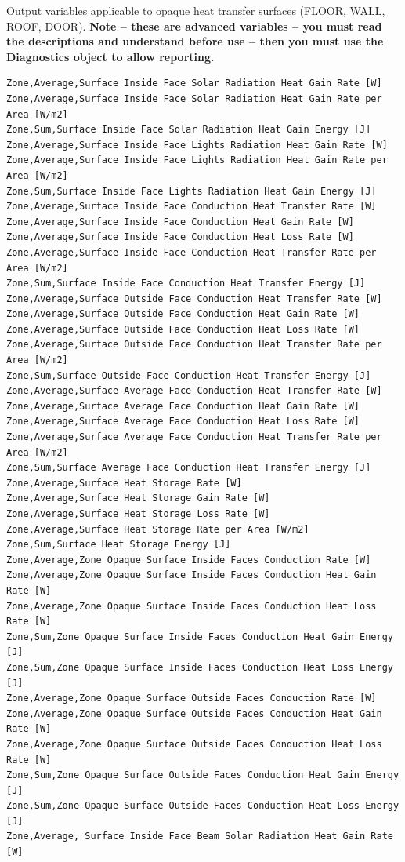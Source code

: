 Output variables applicable to opaque heat transfer surfaces (FLOOR, WALL, ROOF, DOOR). \textbf{Note -- these are advanced variables -- you must read the descriptions and understand before use -- then you must use the Diagnostics object to allow reporting.}

\begin{lstlisting}
Zone,Average,Surface Inside Face Solar Radiation Heat Gain Rate [W]
Zone,Average,Surface Inside Face Solar Radiation Heat Gain Rate per Area [W/m2]
Zone,Sum,Surface Inside Face Solar Radiation Heat Gain Energy [J]
Zone,Average,Surface Inside Face Lights Radiation Heat Gain Rate [W]
Zone,Average,Surface Inside Face Lights Radiation Heat Gain Rate per Area [W/m2]
Zone,Sum,Surface Inside Face Lights Radiation Heat Gain Energy [J]
Zone,Average,Surface Inside Face Conduction Heat Transfer Rate [W]
Zone,Average,Surface Inside Face Conduction Heat Gain Rate [W]
Zone,Average,Surface Inside Face Conduction Heat Loss Rate [W]
Zone,Average,Surface Inside Face Conduction Heat Transfer Rate per Area [W/m2]
Zone,Sum,Surface Inside Face Conduction Heat Transfer Energy [J]
Zone,Average,Surface Outside Face Conduction Heat Transfer Rate [W]
Zone,Average,Surface Outside Face Conduction Heat Gain Rate [W]
Zone,Average,Surface Outside Face Conduction Heat Loss Rate [W]
Zone,Average,Surface Outside Face Conduction Heat Transfer Rate per Area [W/m2]
Zone,Sum,Surface Outside Face Conduction Heat Transfer Energy [J]
Zone,Average,Surface Average Face Conduction Heat Transfer Rate [W]
Zone,Average,Surface Average Face Conduction Heat Gain Rate [W]
Zone,Average,Surface Average Face Conduction Heat Loss Rate [W]
Zone,Average,Surface Average Face Conduction Heat Transfer Rate per Area [W/m2]
Zone,Sum,Surface Average Face Conduction Heat Transfer Energy [J]
Zone,Average,Surface Heat Storage Rate [W]
Zone,Average,Surface Heat Storage Gain Rate [W]
Zone,Average,Surface Heat Storage Loss Rate [W]
Zone,Average,Surface Heat Storage Rate per Area [W/m2]
Zone,Sum,Surface Heat Storage Energy [J]
Zone,Average,Zone Opaque Surface Inside Faces Conduction Rate [W]
Zone,Average,Zone Opaque Surface Inside Faces Conduction Heat Gain Rate [W]
Zone,Average,Zone Opaque Surface Inside Faces Conduction Heat Loss Rate [W]
Zone,Sum,Zone Opaque Surface Inside Faces Conduction Heat Gain Energy [J]
Zone,Sum,Zone Opaque Surface Inside Faces Conduction Heat Loss Energy [J]
Zone,Average,Zone Opaque Surface Outside Faces Conduction Rate [W]
Zone,Average,Zone Opaque Surface Outside Faces Conduction Heat Gain Rate [W]
Zone,Average,Zone Opaque Surface Outside Faces Conduction Heat Loss Rate [W]
Zone,Sum,Zone Opaque Surface Outside Faces Conduction Heat Gain Energy [J]
Zone,Sum,Zone Opaque Surface Outside Faces Conduction Heat Loss Energy [J]
Zone,Average, Surface Inside Face Beam Solar Radiation Heat Gain Rate [W]
\end{lstlisting}

